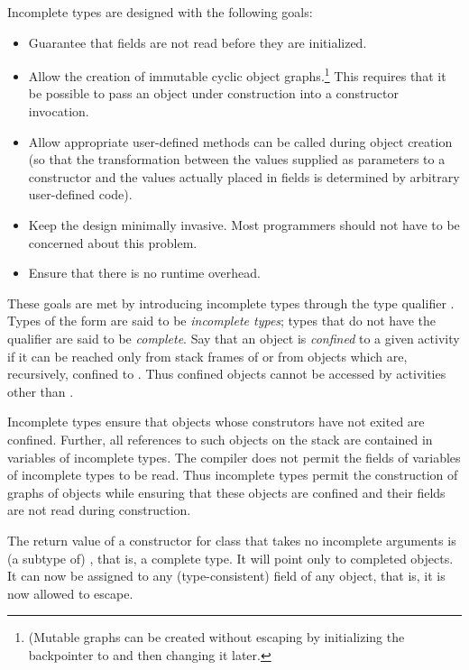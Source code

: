 Incomplete types are designed with the following goals:
 \begin{itemize}

\item Guarantee that fields are not read before they are initialized.

\item  Allow the creation of immutable cyclic object graphs.\footnote{(Mutable
       graphs can be created without escaping  
    by initializing the backpointer to  and then
    changing it later.}  This requires that it be possible to pass an
  object under construction into a constructor invocation.

\item Allow appropriate user-defined methods can be called during object
  creation (so that the transformation between the values supplied as
  parameters to a constructor and the values actually placed in fields
  is determined by arbitrary user-defined code).

\item Keep the design minimally invasive. Most programmers should
  not have to be concerned about this problem.

\item Ensure that there is no runtime overhead. 
\end{itemize}

These goals are met by introducing incomplete types through the type
qualifier . Types of the form  are said to be
{\em incomplete types}; types that do not have the qualifier are said to be
{\em complete}.
 Say that an object  is {\em confined}
to a given activity  if it can be reached only from stack
frames of  or from objects which are, recursively, confined to
. Thus confined objects cannot be accessed by activities other
than .

Incomplete types ensure that objects whose construtors have not exited
are confined. Further, all references to such objects on the stack
are contained in variables of incomplete types. The compiler does not
permit the fields of variables of incomplete types to be read. 
Thus incomplete types permit the construction of graphs of objects
while ensuring that these objects are confined and their fields are not
read during construction. 

The return value of a constructor for class  that takes no
incomplete arguments is (a subtype of) , that is, a complete
type. It will point only to completed objects. It can now be
assigned to any (type-consistent) field of any object, that is, it is
now allowed to escape.

